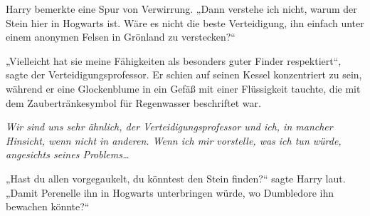 Harry bemerkte eine Spur von Verwirrung.
„Dann verstehe ich nicht, warum der Stein hier in Hogwarts ist. Wäre es nicht die beste Verteidigung, ihn einfach unter einem anonymen Felsen in Grönland zu verstecken?“

„Vielleicht hat sie meine Fähigkeiten als besonders guter Finder respektiert“, sagte der Verteidigungsprofessor.
Er schien auf seinen Kessel konzentriert zu sein, während er eine Glockenblume in ein Gefäß mit einer Flüssigkeit tauchte, die mit dem Zaubertränkesymbol für Regenwasser beschriftet war.

\emph{Wir sind uns sehr ähnlich, der Verteidigungsprofessor und ich, in mancher Hinsicht, wenn nicht in anderen. Wenn ich mir vorstelle, was ich tun würde, angesichts seines Problems…}

„Hast du allen vorgegaukelt, du könntest den Stein finden?“ sagte Harry laut.
„Damit Perenelle ihn in Hogwarts unterbringen würde, wo Dumbledore ihn bewachen könnte?“

